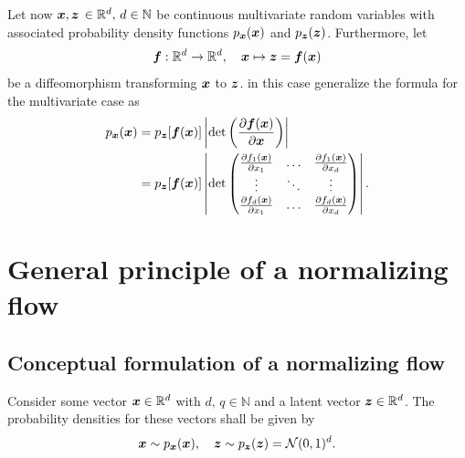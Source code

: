 \documentclass[a4paper,12pt]{report}
\def\lk#1{{\color{black}{#1}}}
\begin{document}
Let now $\bm{x}, \bm{z} \,\in\mathbb{R}^d,\,d\in\mathbb{N}$ be continuous multivariate random variables with associated probability density functions $p_{\bm{x}}(\bm{x})$ and $p_{\bm{z}}(\bm{z})$. Furthermore, let 
\begin{equation} 
\bm{f}:\mathbb{R}^d \rightarrow \mathbb{R}^d, \quad \bm{x}\mapsto\bm{z} = \bm{f}(\bm{x}) 
\end{equation} be a diffeomorphism transforming $\bm{x}$ to $\bm{z}$. \cite[p.196]{Deisenroth.2020} in this case generalize the \lk{change of variable} formula for the multivariate case as \begin{align}\begin{aligned}
p_{\bm{x}}(\bm{x}) &= p_{\bm{z}}[\bm{f}(\bm{x})]\left|\det\left(\frac{\partial \bm{f}(\bm{x})}{\partial \bm{x}}\right)\right| \\ &= p_{\bm{z}}[\bm{f}(\bm{x})]\left|\det\begin{pmatrix}
\tfrac{\partial f_1(\bm{x})}{\partial x_1} & \dots & \tfrac{\partial f_1(\bm{x})}{\partial x_d} \\
\vdots & \ddots & \vdots \\
\tfrac{\partial f_d(\bm{x})}{\partial x_1} & \dots & \tfrac{\partial f_d(\bm{x})}{\partial x_d}
\end{pmatrix}\right|.
\end{aligned}\end{align}

\section{General principle of a normalizing flow}

\subsection{Conceptual formulation of a normalizing flow}
Consider some vector $\bm{x} \in \mathbb{R}^d$ with $d,\,q \in \mathbb{N}$ and a latent vector $\bm{z} \in \mathbb{R}^d$. The probability densities for these vectors shall be given by \begin{equation}
\bm{x} \sim p_{\bm{x}}(\bm{x}), \quad \bm{z}\sim p_{\bm{z}}(\bm{z}) = \mathcal{N}(0,1)^d.
\end{equation}
\end{document}
